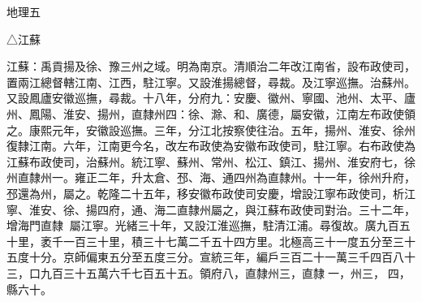 
\begin{pinyinscope}
地理五

△江蘇

江蘇：禹貢揚及徐、豫三州之域。明為南京。清順治二年改江南省，設布政使司，置兩江總督轄江南、江西，駐江寧。又設淮揚總督，尋裁。及江寧巡撫。治蘇州。又設鳳廬安徽巡撫，尋裁。十八年，分府九：安慶、徽州、寧國、池州、太平、廬州、鳳陽、淮安、揚州，直隸州四：徐、滁、和、廣德，屬安徽，江南左布政使領之。康熙元年，安徽設巡撫。三年，分江北按察使往治。五年，揚州、淮安、徐州復隸江南。六年，江南更今名，改左布政使為安徽布政使司，駐江寧。右布政使為江蘇布政使司，治蘇州。統江寧、蘇州、常州、松江、鎮江、揚州、淮安府七，徐州直隸州一。雍正二年，升太倉、邳、海、通四州為直隸州。十一年，徐州升府，邳還為州，屬之。乾隆二十五年，移安徽布政使司安慶，增設江寧布政使司，析江寧、淮安、徐、揚四府，通、海二直隸州屬之，與江蘇布政使司對治。三十二年，增海門直隸，屬江寧。光緒三十年，又設江淮巡撫，駐清江浦。尋復故。廣九百五十里，袤千一百三十里，積三十七萬二千五十四方里。北極高三十一度五分至三十五度十分。京師偏東五分至五度三分。宣統三年，編戶三百二十一萬三千四百八十三，口九百三十五萬六千七百五十五。領府八，直隸州三，直隸一，州三，四，縣六十。


\end{pinyinscope}
